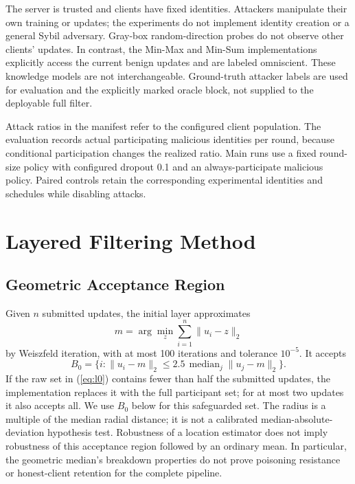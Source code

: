 \documentclass[journal]{IEEEtran}
\begin{document}
The server is trusted and clients have fixed identities. Attackers manipulate their own training or updates; the experiments do not implement identity creation or a general Sybil adversary. Gray-box random-direction probes do not observe other clients' updates. In contrast, the Min-Max and Min-Sum implementations explicitly access the current benign updates and are labeled omniscient. These knowledge models are not interchangeable. Ground-truth attacker labels are used for evaluation and the explicitly marked oracle block, not supplied to the deployable full filter.

Attack ratios in the manifest refer to the configured client population. The evaluation records actual participating malicious identities per round, because conditional participation changes the realized ratio. Main runs use a fixed round-size policy with configured dropout 0.1 and an always-participate malicious policy. Paired controls retain the corresponding experimental identities and schedules while disabling attacks.

\section{Layered Filtering Method}
\subsection{Geometric Acceptance Region}
Given $n$ submitted updates, the initial layer approximates
\begin{equation}
 m=\arg\min_z\sum_{i=1}^{n}\|u_i-z\|_2
\end{equation}
by Weiszfeld iteration, with at most 100 iterations and tolerance $10^{-5}$. It accepts
\begin{equation}
 B_0=\{i:\|u_i-m\|_2\leq 2.5\,\operatorname{median}_j\|u_j-m\|_2\}.
 \label{eq:l0}
\end{equation}
If the raw set in (\ref{eq:l0}) contains fewer than half the submitted updates, the implementation replaces it with the full participant set; for at most two updates it also accepts all. We use $B_0$ below for this safeguarded set. The radius is a multiple of the median radial distance; it is not a calibrated median-absolute-deviation hypothesis test. Robustness of a location estimator does not imply robustness of this acceptance region followed by an ordinary mean. In particular, the geometric median's breakdown properties do not prove poisoning resistance or honest-client retention for the complete pipeline.
\end{document}
